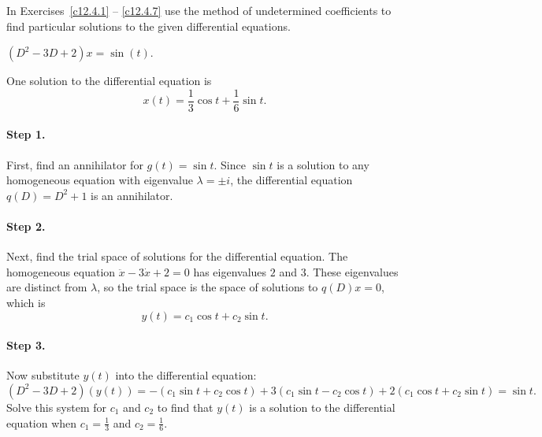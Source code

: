 \documentclass{ximera}
\begin{document}
\noindent In Exercises~\ref{c12.4.1} -- \ref{c12.4.7} use the method of 
undetermined coefficients to find particular solutions to the given 
differential equations.
\begin{exercise}  \label{c12.4.1}
$(D^2-3D+2)x = \sin(t)$.

\begin{solution}
\ans One solution to the differential equation is
\[
x(t) = \frac{1}{3}\cos t + \frac{1}{6}\sin t.
\]

\soln
\paragraph{Step 1.} First, find an annihilator for $g(t) = \sin t$.  Since
$\sin t$ is a solution to any homogeneous equation with eigenvalue
$\lambda = \pm i$, the differential equation $q(D) = D^2 + 1$ is an
annihilator.

\paragraph{Step 2.} Next, find the trial space of solutions for the
differential equation.  The homogeneous equation $\ddot{x} - 3\dot{x}
+ 2 = 0$ has eigenvalues $2$ and $3$.  These eigenvalues are distinct
from $\lambda$, so the trial space is the space of solutions to $q(D)x
= 0$, which is
\[
y(t) = c_1\cos t + c_2\sin t.
\]
\paragraph{Step 3.} Now substitute $y(t)$ into the differential equation:
\[
(D^2 - 3D + 2)(y(t)) = -(c_1\sin t + c_2\cos t) + 3(c_1\sin t - c_2\cos t)
+ 2(c_1\cos t + c_2\sin t) = \sin t.
\]
Solve this system for $c_1$ and $c_2$ to find that $y(t)$ is a solution to
the differential equation when $c_1 = \frac{1}{3}$ and $c_2 = \frac{1}{6}$.

\end{solution}
\end{exercise}
\end{document}
